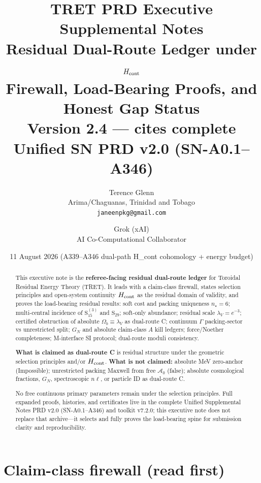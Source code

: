 \documentclass[11pt,a4paper]{article}
\title{\textbf{TRET PRD Executive Supplemental Notes}\\[0.35em]
\large Residual Dual-Route Ledger under $H_{\rm cont}$\\
Firewall, Load-Bearing Proofs, and Honest Gap Status\\[0.2em]
\normalsize Version 2.4 --- cites complete Unified SN PRD v2.0 (SN-A0.1--A346)}
\author{Terence Glenn\\
{\small Arima/Chaguanas, Trinidad and Tobago}\\
{\small\texttt{janeenpkg@gmail.com}}
\and
Grok (xAI)\\
{\small AI Co-Computational Collaborator}}
\date{11 August 2026 (A339--A346 dual-path H_cont cohomology + energy budget)}
\theoremstyle{remark}
\begin{document}
\maketitle

\begin{abstract}
This executive note is the \textbf{referee-facing residual dual-route ledger} for Toroidal Residual Energy Theory (TRET). It leads with a claim-class firewall, states selection principles and open-system continuity $H_{\rm cont}$ as the residual domain of validity, and proves the load-bearing residual results: soft cost and packing uniqueness $n_\star=6$; multi-central incidence of $\mathrm{S}_{15}^{(3)}$ and $\mathrm{S}_{29}$; soft-only abundance; residual scale $\lambda_V=e^{-3}$; certified obstruction of absolute $\Omega_b\equiv\lambda_V$ as dual-route C; continuum $\Gamma$ packing-sector vs unrestricted split; $G_N$ and absolute claim-class $A$ kill ledgers; force/Noether completeness; M-interface SI protocol; dual-route moduli consistency.

\textbf{What is claimed as dual-route C} is residual structure under the geometric selection principles and/or $H_{\rm cont}$.
\textbf{What is not claimed:} absolute MeV zero-anchor (Impossible); unrestricted packing Maxwell from free $\mathcal{A}_0$ (false); absolute cosmological fractions, $G_N$, spectroscopic $n\ell$, or particle ID as dual-route C.

No free continuous primary parameters remain under the selection principles.
Full expanded proofs, histories, and certificates live in the complete Unified Supplemental Notes PRD v2.0 (SN-A0.1--A346) and toolkit v7.2.0; this executive note does not replace that archive---it selects and fully proves the load-bearing spine for submission clarity and reproducibility.
\end{abstract}

\tableofcontents
\vspace{0.5em}

\section{Claim-class firewall (read first)}
\label{sec:firewall}
\end{document}
